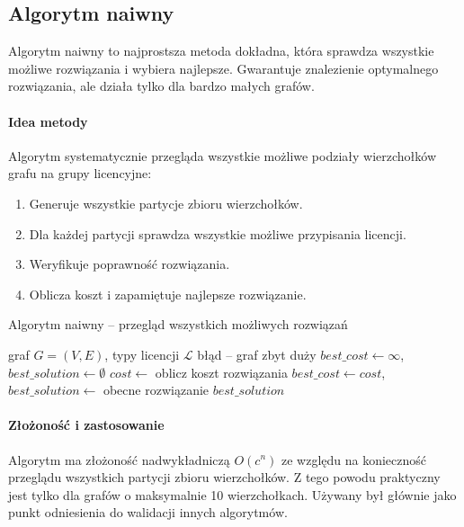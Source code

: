 \subsection{Algorytm naiwny}

Algorytm naiwny to najprostsza metoda dokładna, która sprawdza wszystkie możliwe rozwiązania i wybiera najlepsze. Gwarantuje znalezienie optymalnego rozwiązania, ale działa tylko dla bardzo małych grafów.

\paragraph{Idea metody}
Algorytm systematycznie przegląda wszystkie możliwe podziały wierzchołków grafu na grupy licencyjne:
\begin{enumerate}
  \item Generuje wszystkie partycje zbioru wierzchołków.
  \item Dla każdej partycji sprawdza wszystkie możliwe przypisania licencji.
  \item Weryfikuje poprawność rozwiązania.
  \item Oblicza koszt i zapamiętuje najlepsze rozwiązanie.
\end{enumerate}

\begin{algorithm}[H]
  \caption{Algorytm naiwny -- przegląd wszystkich możliwych rozwiązań}
  \label{alg:naive}
  \begin{algorithmic}[1]
    \Require graf $G=(V,E)$, typy licencji $\mathcal{L}$
     \State \Return błąd -- graf zbyt duży \EndIf
    \State $best\_cost \gets \infty$, $best\_solution \gets \emptyset$
    \State $cost \gets$ oblicz koszt rozwiązania
    \State $best\_cost \gets cost$, $best\_solution \gets$ obecne rozwiązanie
    \EndIf
    \EndIf
    \EndFor
    \EndFor
    \State \Return $best\_solution$
  \end{algorithmic}
\end{algorithm}

\paragraph{Złożoność i zastosowanie}
Algorytm ma złożoność nadwykładniczą $O(c^n)$ ze względu na konieczność przeglądu wszystkich partycji zbioru wierzchołków. Z tego powodu praktyczny jest tylko dla grafów o maksymalnie 10 wierzchołkach. Używany był głównie jako punkt odniesienia do walidacji innych algorytmów.


